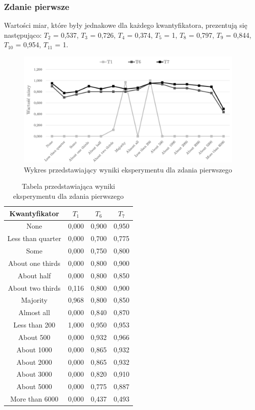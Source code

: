 \documentclass{classrep}
\begin{document}
\clearpage



\subsubsection{Zdanie pierwsze}

Wartości miar, które były jednakowe dla każdego kwantyfikatora, prezentują się następująco:
$T_2$ = 0,537, $T_3$ = 0,726, $T_4$ = 0,374, $T_5$ = 1, $T_8$ = 0,797, $T_9$ = 0,844, $T_{10}$ = 0,954, $T_{11}$ = 1.

\begin{figure}[H]
	\centering
	\includegraphics[width=0.99\textwidth]{Pictures/ResultCharts/Eks1_1.png}
	\caption{Wykres przedstawiający wyniki eksperymentu dla zdania pierwszego}
\end{figure}

\begin{table}[H]
	\centering
	\begin{tabular}{c c c c} 
		\hline
		\textbf{Kwantyfikator}  & \textbf{$T_1$} & \textbf{$T_6$} & \textbf{$T_7$}\\ [0.5ex] 
		\hline
		\hline
None	&	0,000	&	0,900	&	0,950	\\
Less than quarter	&	0,000	&	0,700	&	0,775	\\
Some 	&	0,000	&	0,750	&	0,800	\\
About one thirds 	&	0,000	&	0,800	&	0,900	\\
About half 	&	0,000	&	0,800	&	0,850	\\
About two thirds 	&	0,116	&	0,800	&	0,900	\\
Majority 	&	0,968	&	0,800	&	0,850	\\
Almost all	&	0,000	&	0,840	&	0,870	\\
Less than 200	&	1,000	&	0,950	&	0,953	\\
About 500	&	0,000	&	0,932	&	0,966	\\
About 1000	&	0,000	&	0,865	&	0,932	\\
About 2000	&	0,000	&	0,865	&	0,932	\\
About 3000	&	0,000	&	0,820	&	0,910	\\
About 5000	&	0,000	&	0,775	&	0,887	\\
More than 6000	&	0,000	&	0,437	&	0,493	\\
		\hline
	\end{tabular}
	\caption{Tabela przedstawiająca wyniki eksperymentu dla zdania pierwszego}
\end{table}
\end{document}
